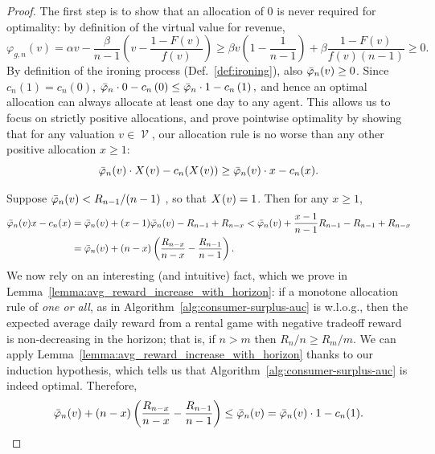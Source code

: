 \documentclass[11pt,letterpaper]{article}
\newcommand{\brackets}[1]{\left( #1 \right)}
\DeclareMathOperator{\V}{\mathcal{V}}
\newcommand{\g}{g}
\newcommand{\irn}{\Bar{\varphi}}
\theoremstyle{plain}
\begin{document}
\begin{proof}
    The first step is to show that an allocation of $0$ is never required for optimality:
    by definition of the virtual value for revenue, 
    \begin{equation*}
        \varphi_{\g,n}(v)
        =
        \alpha v-\frac{\beta}{n-1}\brackets{v-\frac{1-F(v)}{f(v)}}
        \geq
        \beta v\brackets{1-\frac{1}{n-1}}+\beta\frac{1-F(v)}{f(v)(n-1)}
        \geq 0
        .
        \end{equation*}
        By definition of the ironing process (Def.~\ref{def:ironing}), also $\irn_n(v)\geq0$.
         Since $c_n(1)=c_n(0)$,
          $
             \irn_n\cdot0 - c_n\brackets{0}\leq \irn_n\cdot 1 - c_n\brackets{1},
             $
         {and}
         hence 
         {an optimal allocation}
         can always allocate at least one day to any agent.
         {This allows us to focus on strictly positive allocations,
         and prove pointwise optimality
         by showing that
         for any valuation $v \in \V$,
        our allocation rule is no worse than any other positive allocation $x \geq 1$:
         \begin{equation*}
            \irn_n(v)\cdot\x{v}-c_n(\x{v})\geq\irn_n(v)\cdot x-c_n(x).
        \end{equation*}
         }

    
Suppose $\irn_n(v)<R_{n-1}/(n-1)$ ,
        so that $\x{v} = 1$.
        Then for any $x \geq 1$,
        \begin{align*}
            \irn_n(v)x-c_n(x)&=\irn_n(v)+(x-1)\irn_n(v)-R_{n-1}+R_{n-x}
            <
            \irn_n(v)+\frac{x-1}{n-1}R_{n-1}-R_{n-1}+R_{n-x}
            \\
            &=
            \irn_n(v)+(n-x)\brackets{\frac{R_{n-x}}{n-x}-\frac{R_{n-1}}{n-1}}.
        \end{align*}
        We now rely on an interesting (and intuitive) fact, which we prove in Lemma~\ref{lemma:avg_reward_increase_with_horizon}: if a monotone allocation rule of \emph{one or all}, as in Algorithm~\ref{alg:consumer-surplus-auc} is w.l.o.g., then
the expected average daily reward from a rental game with negative tradeoff reward is non-decreasing in the horizon;
that is,
if $n > m$
then ${R_n}/{n}\geq {R_m}/{m}$.
We can apply Lemma~\ref{lemma:avg_reward_increase_with_horizon} thanks to our induction hypothesis, which tells us that Algorithm~\ref{alg:consumer-surplus-auc} is indeed optimal.
Therefore,        
        \begin{align*}
                    \irn_n(v)+(n-x)\brackets{\frac{R_{n-x}}{n-x}-\frac{R_{n-1}}{n-1}}
            \leq \irn_n(v)
            =
            \irn_n(v) \cdot 1 -c_n(1).
        \end{align*}



\end{proof}
\end{document}
